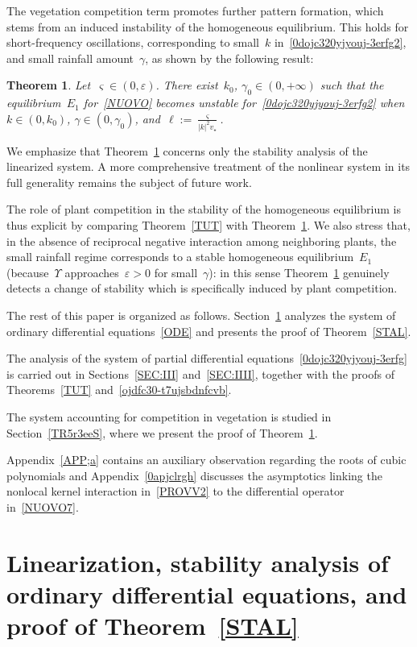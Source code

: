 \documentclass[12pt]{amsart}
\renewcommand{\epsilon}{\varepsilon}
\numberwithin{equation}{section}
\newtheorem{theorem}{Theorem}[section]
\begin{document}
The vegetation competition term promotes further pattern formation, which stems from an
induced instability of the homogeneous equilibrium.
This holds for short-frequency oscillations, corresponding to small~$k$ in~\eqref{0dojc320yjyouj-3erfg2},
and small rainfall amount~$\gamma$, as shown by the following result:

\begin{theorem}\label{TR5r3ee}
Let~$\varsigma\in(0,\epsilon)$.
There exist~$k_0$, $\gamma_0\in(0,+\infty)$ such that
the equilibrium~$E_1$ for~\eqref{NUOVO}
becomes unstable for~\eqref{0dojc320yjyouj-3erfg2} 
when~$k\in(0,k_0)$, $\gamma\in(0,\gamma_0)$, and~$\ell:=\frac{\varsigma}{|k|^2 v_\star}$.
\end{theorem}

We emphasize that Theorem~\ref{TR5r3ee} concerns only the stability analysis of the linearized system. A more
comprehensive treatment of the nonlinear system in its full generality remains the subject of future work.

The role of plant competition in the stability of the homogeneous equilibrium
is thus explicit by comparing Theorem~\ref{TUT} with Theorem~\ref{TR5r3ee}. We also stress that, in the absence of reciprocal negative interaction among neighboring plants, the small rainfall regime
corresponds to a stable homogeneous equilibrium~$E_1$
(because~$\Upsilon$ approaches~$\epsilon>0$ for small~$\gamma$): in this sense Theorem~\ref{TR5r3ee} genuinely
detects a change of stability which is specifically induced
by plant competition.

The rest of this paper is organized as follows. Section~\ref{SEC:II}
analyzes the system of ordinary differential equations~\eqref{ODE}
and presents the proof of Theorem~\ref{STAL}.

The analysis of the system of partial differential equations~\eqref{0dojc320yjyouj-3erfg}
is carried out in Sections~\ref{SEC:III} and~\ref{SEC:IIII}, together with the proofs of
Theorems~\ref{TUT} and~\ref{ojdfc30-t7ujsbdnfcvb}.

The system accounting for competition in vegetation is studied in Section~\ref{TR5r3eeS}, where we present
the proof of Theorem~\ref{TR5r3ee}.

Appendix~\ref{APP;a} contains an auxiliary observation regarding the roots of cubic polynomials 
and Appendix~\ref{0apjclrgh} discusses the asymptotics linking
the nonlocal kernel interaction in~\eqref{PROVV2} to the differential operator in~\eqref{NUOVO7}.

\section{Linearization, stability analysis of ordinary differential equations, and proof of Theorem~\ref{STAL}}\label{SEC:II}
\end{document}
